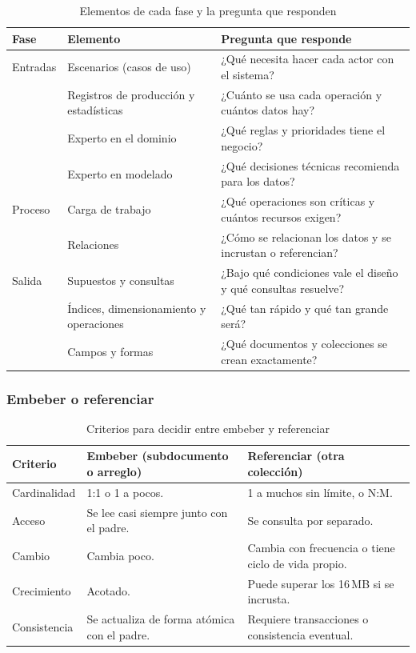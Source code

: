 \documentclass[11pt,a4paper]{article}
\begin{document}
	\begin{table}[H]
		\centering
		\caption{Elementos de cada fase y la pregunta que responden}
		\small
		\begin{tabularx}{\textwidth}{>{\raggedright\arraybackslash}p{2cm}>{\raggedright\arraybackslash}p{4.6cm}Y}
			\toprule
			\textbf{Fase} & \textbf{Elemento} & \textbf{Pregunta que responde} \\
			\midrule
			Entradas & Escenarios (casos de uso) & ¿Qué necesita hacer cada actor con el sistema? \\
			& Registros de producción y estadísticas & ¿Cuánto se usa cada operación y cuántos datos hay? \\
			& Experto en el dominio & ¿Qué reglas y prioridades tiene el negocio? \\
			& Experto en modelado & ¿Qué decisiones técnicas recomienda para los datos? \\
			\midrule
			Proceso & Carga de trabajo & ¿Qué operaciones son críticas y cuántos recursos exigen? \\
			& Relaciones & ¿Cómo se relacionan los datos y se incrustan o referencian? \\
			\midrule
			Salida & Supuestos y consultas & ¿Bajo qué condiciones vale el diseño y qué consultas resuelve? \\
			& Índices, dimensionamiento y operaciones & ¿Qué tan rápido y qué tan grande será? \\
			& Campos y formas & ¿Qué documentos y colecciones se crean exactamente? \\
			\bottomrule
		\end{tabularx}
	\end{table}
	
	\subsubsection{Embeber o referenciar}
	\begin{table}[H]
		\centering
		\caption{Criterios para decidir entre embeber y referenciar}
		\small
		\begin{tabularx}{\textwidth}{>{\raggedright\arraybackslash}p{2.6cm}YY}
			\toprule
			\textbf{Criterio} & \textbf{Embeber (subdocumento o arreglo)} & \textbf{Referenciar (otra colección)} \\
			\midrule
			Cardinalidad & 1:1 o 1 a pocos. & 1 a muchos sin límite, o N:M. \\
			Acceso & Se lee casi siempre junto con el padre. & Se consulta por separado. \\
			Cambio & Cambia poco. & Cambia con frecuencia o tiene ciclo de vida propio. \\
			Crecimiento & Acotado. & Puede superar los 16\,MB si se incrusta. \\
			Consistencia & Se actualiza de forma atómica con el padre. & Requiere transacciones o consistencia eventual. \\
			\bottomrule
		\end{tabularx}
	\end{table}
	
\end{document}
